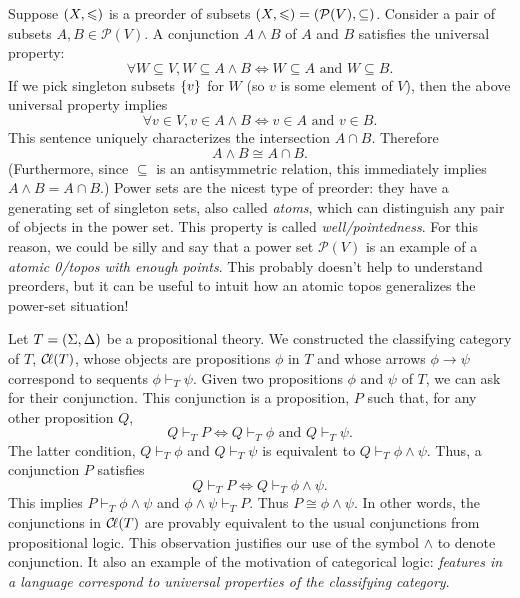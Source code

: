 \documentclass{../thesis-note}
\begin{document}
\begin{example}
  Suppose \({\left(X,\leqslant\right)}\) is a preorder of subsets \({\left(X,\leqslant\right)} =
  {\left(\mathcal{P}(V),\subseteq\right)}\). Consider a pair of subsets \(A, B \in
  \mathcal{P}(V)\). A conjunction \(A \wedge B\) of \(A\) and \(B\) satisfies
  the universal property:
  \[%
    \forall W \subseteq V, W \subseteq A \wedge B \Leftrightarrow W \subseteq A
    \text{ and } W \subseteq B.
  \]%
  If we pick singleton subsets \({\left\{v\right\}}\) for \(W\) (so \(v\) is some element
  of \(V\)), then the above universal property implies
  \[%
    \forall v \in V, v \in A \wedge B \Leftrightarrow v \in A \text{ and } v \in
    B.
  \]%
  This sentence uniquely characterizes the intersection \(A \cap B\). Therefore
  \[%
    A \wedge B \cong A \cap B.
  \]%
  (Furthermore, since \(\subseteq\) is an antisymmetric relation, this
  immediately implies \(A \wedge B = A \cap B\).) Power sets are the nicest type
  of preorder: they have a generating set of singleton sets, also called
  \emph{atoms}, which can distinguish any pair of objects in the power set. This
  property is called \emph{well\-/pointedness}. For this reason, we could be
  silly and say that a power set \(\mathcal{P}(V)\) is an example of a
  \emph{atomic 0\-/topos with enough points}. This probably doesn't help to
  understand preorders, but it can be useful to intuit how an atomic topos
  generalizes the power-set situation!
\end{example}
\begin{example}
  Let \(T = {\left(\Sigma,\Delta\right)}\) be a propositional theory. We constructed
  the classifying category of \(T\), \({\mathcal{C}\kern-.15em\ell}(T)\), whose objects are propositions
  \(\phi\) in \(T\) and whose arrows \(\phi \to \psi\) correspond to sequents
  \(\phi \vdash_T \psi\). Given two propositions \(\phi\) and \(\psi\) of \(T\),
  we can ask for their conjunction. This conjunction is a proposition, \(P\)
  such that, for any other proposition \(Q\),
  \[%
    Q \vdash_T P \Leftrightarrow Q \vdash_T \phi \text{ and } Q \vdash_T \psi.
  \]%
  The latter condition, \(Q \vdash_T \phi\) and \(Q \vdash_T \psi\) is
  equivalent to \(Q \vdash_T \phi \wedge \psi\). Thus, a conjunction \(P\)
  satisfies
  \[%
    Q \vdash_T P \Leftrightarrow Q \vdash_T \phi \wedge \psi.
  \]%
  This implies \(P \vdash_T \phi \wedge \psi\) and \(\phi \wedge \psi \vdash_T
  P\). Thus \(P \cong \phi \wedge \psi\). In other words, the conjunctions in
  \({\mathcal{C}\kern-.15em\ell}{\left(T\right)}\) are provably equivalent to the usual conjunctions from
  propositional logic. This observation justifies our use of the symbol
  \(\wedge\) to denote conjunction. It also an example of the motivation of
  categorical logic: \emph{features in a language correspond to universal
    properties of the classifying category}.
\end{example}
\end{document}
